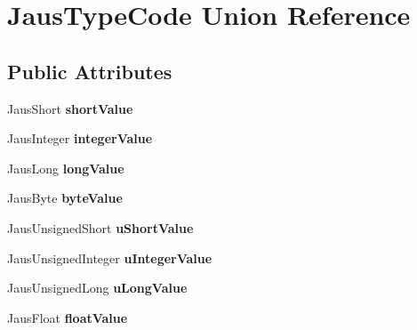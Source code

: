 \hypertarget{union_jaus_type_code}{\section{\-Jaus\-Type\-Code \-Union \-Reference}
\label{union_jaus_type_code}
}
\subsection*{\-Public \-Attributes}
\begin{DoxyCompactItemize}
\item 
\hypertarget{union_jaus_type_code_a75832cc7dc8ad069320d1c44dd80feca}{\-Jaus\-Short {\bfseries short\-Value}}\label{union_jaus_type_code_a75832cc7dc8ad069320d1c44dd80feca}

\item 
\hypertarget{union_jaus_type_code_a334a1bdb2fca2391b428d5315b4ce49d}{\-Jaus\-Integer {\bfseries integer\-Value}}\label{union_jaus_type_code_a334a1bdb2fca2391b428d5315b4ce49d}

\item 
\hypertarget{union_jaus_type_code_a4596cec41e758df123af6d545618fe4d}{\-Jaus\-Long {\bfseries long\-Value}}\label{union_jaus_type_code_a4596cec41e758df123af6d545618fe4d}

\item 
\hypertarget{union_jaus_type_code_a119ed952d217b7f11e3a429d1a921eb7}{\-Jaus\-Byte {\bfseries byte\-Value}}\label{union_jaus_type_code_a119ed952d217b7f11e3a429d1a921eb7}

\item 
\hypertarget{union_jaus_type_code_a704c3a734e7c1f8e2c568eef61529d27}{\-Jaus\-Unsigned\-Short {\bfseries u\-Short\-Value}}\label{union_jaus_type_code_a704c3a734e7c1f8e2c568eef61529d27}

\item 
\hypertarget{union_jaus_type_code_ab5101d938ede9703747df3fb95175734}{\-Jaus\-Unsigned\-Integer {\bfseries u\-Integer\-Value}}\label{union_jaus_type_code_ab5101d938ede9703747df3fb95175734}

\item 
\hypertarget{union_jaus_type_code_adff2e1d983d5eb85ae10f26a828348f8}{\-Jaus\-Unsigned\-Long {\bfseries u\-Long\-Value}}\label{union_jaus_type_code_adff2e1d983d5eb85ae10f26a828348f8}

\item 
\hypertarget{union_jaus_type_code_ae08144cf546e54e7f6132525cdc7d1f3}{\-Jaus\-Float {\bfseries float\-Value}}\label{union_jaus_type_code_ae08144cf546e54e7f6132525cdc7d1f3}


\end{DoxyCompactItemize}

